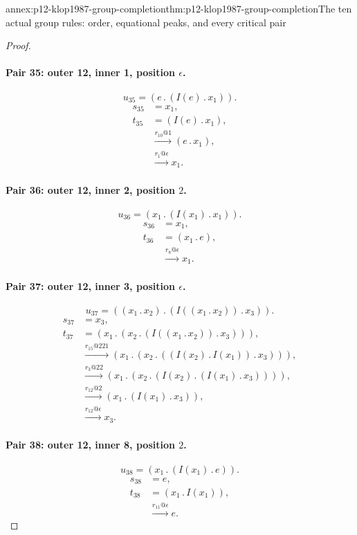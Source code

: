 \begin{annexitem}{annex:p12-klop1987-group-completion}{thm:p12-klop1987-group-completion}{The ten actual group rules: order, equational peaks, and every critical pair}
\begin{proof}
\paragraph{Pair 35: outer 12, inner 1, position \(\epsilon\).}
\[
 u_{35}=(e\mathbin{.}(I(e)\mathbin{.}x_{1})).
\]
\begin{align*}
 s_{35}&=x_{1},\\
 t_{35}&=(I(e)\mathbin{.}x_{1}),\\
 &\xrightarrow{r_{10}@1}(e\mathbin{.}x_{1}),\\
 &\xrightarrow{r_{1}@\epsilon}x_{1}.
\end{align*}

\paragraph{Pair 36: outer 12, inner 2, position \(2\).}
\[
 u_{36}=(x_{1}\mathbin{.}(I(x_{1})\mathbin{.}x_{1})).
\]
\begin{align*}
 s_{36}&=x_{1},\\
 t_{36}&=(x_{1}\mathbin{.}e),\\
 &\xrightarrow{r_{8}@\epsilon}x_{1}.
\end{align*}

\paragraph{Pair 37: outer 12, inner 3, position \(\epsilon\).}
\[
 u_{37}=((x_{1}\mathbin{.}x_{2})\mathbin{.}(I((x_{1}\mathbin{.}x_{2}))\mathbin{.}x_{3})).
\]
\begin{align*}
 s_{37}&=x_{3},\\
 t_{37}&=(x_{1}\mathbin{.}(x_{2}\mathbin{.}(I((x_{1}\mathbin{.}x_{2}))\mathbin{.}x_{3}))),\\
 &\xrightarrow{r_{15}@221}(x_{1}\mathbin{.}(x_{2}\mathbin{.}((I(x_{2})\mathbin{.}I(x_{1}))\mathbin{.}x_{3}))),\\
 &\xrightarrow{r_{3}@22}(x_{1}\mathbin{.}(x_{2}\mathbin{.}(I(x_{2})\mathbin{.}(I(x_{1})\mathbin{.}x_{3})))),\\
 &\xrightarrow{r_{12}@2}(x_{1}\mathbin{.}(I(x_{1})\mathbin{.}x_{3})),\\
 &\xrightarrow{r_{12}@\epsilon}x_{3}.
\end{align*}

\paragraph{Pair 38: outer 12, inner 8, position \(2\).}
\[
 u_{38}=(x_{1}\mathbin{.}(I(x_{1})\mathbin{.}e)).
\]
\begin{align*}
 s_{38}&=e,\\
 t_{38}&=(x_{1}\mathbin{.}I(x_{1})),\\
 &\xrightarrow{r_{11}@\epsilon}e.
\end{align*}


\end{proof}
\end{annexitem}
